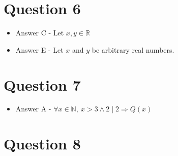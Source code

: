 \documentclass[12pt]{article}
\begin{document}
\section*{Question 6}
\begin{itemize}
    \item Answer C - Let $x,y \in \mathbb{R}$
    \item Answer E - Let $x$ and $y$ be arbitrary real numbers.
\end{itemize}

\section*{Question 7}
\begin{itemize}
    \item Answer A - $\forall x \in \mathbb{N},\:x > 3 \land 2 \mid 2 \Rightarrow Q(x)$
\end{itemize}


\section*{Question 8}
\end{document}

